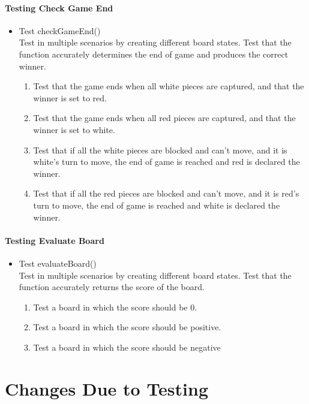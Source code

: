 \documentclass[12pt, titlepage]{article}
\begin{document}
\paragraph{Testing Check Game End}
\begin{itemize}
    \item Test checkGameEnd()\\
    Test in multiple scenarios by creating different board states. Test that the function accurately determines the end of game and produces the correct winner.
    \begin{enumerate}
        \item Test that the game ends when all white pieces are captured, and that the winner is set to red.
        \item Test that the game ends when all red pieces are captured, and that the winner is set to white.
        \item Test that if all the white pieces are blocked and can't move, and it is white's turn to move, the end of game is reached and red is declared the winner.
        \item Test that if all the red pieces are blocked and can't move, and it is red's turn to move, the end of game is reached and white is declared the winner.
    \end{enumerate}
\end{itemize}

\paragraph{Testing Evaluate Board}
\begin{itemize}
    \item Test evaluateBoard()\\
    Test in multiple scenarios by creating different board states. Test that the function accurately returns the score of the board.
    \begin{enumerate}
        \item Test a board in which the score should be 0.
        \item Test a board in which the score should be positive.
        \item Test a board in which the score should be negative
    \end{enumerate}
\end{itemize}

\section{Changes Due to Testing}
\end{document}
